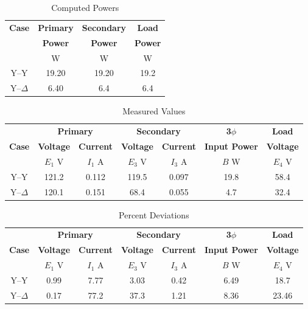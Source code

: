 \documentclass{article}
\begin{document}
\begin{table}[H]
  \centering
  \begin{tabular}{*{4}{c}}
    \textbf{Case} & \textbf{Primary} & \textbf{Secondary} & \textbf{Load} \\

    & \textbf{Power} & \textbf{Power} & \textbf{Power} \\

    & W & W & W \\
    \hline

    Y--Y        & 19.20 & 19.20 & 19.2 \\
    Y--$\Delta$ & 6.40 & 6.4 & 6.4 \\
  \end{tabular}
  \caption{Computed Powers}
  \label{tab:pow_comp}
\end{table}

\begin{table}[H]
  \centering
  \begin{tabular}{*{7}{c}}
    & \multicolumn{2}{c}{\textbf{Primary}} &
    \multicolumn{2}{c}{\textbf{Secondary}} & \textbf{3$\phi$} & \textbf{Load} \\

    \textbf{Case} & \textbf{Voltage} & \textbf{Current} & \textbf{Voltage} &
    \textbf{Current} & \textbf{Input Power} & \textbf{Voltage} \\

    & $E_1$ V & $I_1$ A & $E_3$ V & $I_3$ A & $B$ W & $E_4$ V \\

    \hline
    Y--Y        & 121.2 & 0.112 & 119.5 & 0.097 & 19.8 & 58.4 \\
    Y--$\Delta$ & 120.1 & 0.151 & 68.4 & 0.055 & 4.7 & 32.4 \\
  \end{tabular}
  \caption{Measured Values}
  \label{tab:results}
\end{table}

\begin{table}[H]
  \centering
  \begin{tabular}{*{7}{c}}
    & \multicolumn{2}{c}{\textbf{Primary}} &
    \multicolumn{2}{c}{\textbf{Secondary}} & \textbf{3$\phi$} & \textbf{Load} \\

    \textbf{Case} & \textbf{Voltage} & \textbf{Current} & \textbf{Voltage} &
    \textbf{Current} & \textbf{Input Power} & \textbf{Voltage} \\

    & $E_1$ V & $I_1$ A & $E_3$ V & $I_3$ A & $B$ W & $E_4$ V \\

    \hline
    Y--Y        & 0.99 & 7.77 & 3.03 & 0.42 & 6.49 & 18.7 \\
    Y--$\Delta$ & 0.17 & 77.2 & 37.3 & 1.21 & 8.36 & 23.46 \\
  \end{tabular}
  \caption{Percent Deviations}
  \label{tab:results}
\end{table}
\end{document}
